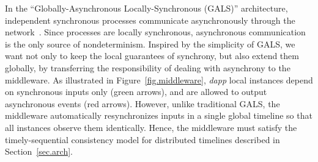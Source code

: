 \documentclass[sigplan,screen]{acmart}
\newcommand{\dapp}{\emph{dapp}\xspace}
\begin{document}
In the ``Globally-Asynchronous Locally-Synchronous (GALS)'' architecture,
independent synchronous processes communicate asynchronously through the
network~\cite{gals.taxonomy}.
Since processes are locally synchronous, asynchronous communication is the only
source of nondeterminism.
%
Inspired by the simplicity of GALS, we want not only to keep the local
guarantees of synchrony, but also extend them globally, by transferring the
responsibility of dealing with asynchrony to the middleware.
%
As illustrated in Figure~\ref{fig.middleware}, \dapp local instances depend on
synchronous inputs only (green arrows), and are allowed to output asynchronous
events (red arrows).
%
However, unlike traditional GALS, the middleware automatically resynchronizes
inputs in a single global timeline so that all instances observe them
identically.
Hence, the middleware must satisfy the timely-sequential consistency model for
distributed timelines described in Section~\ref{sec.arch}.
\end{document}
